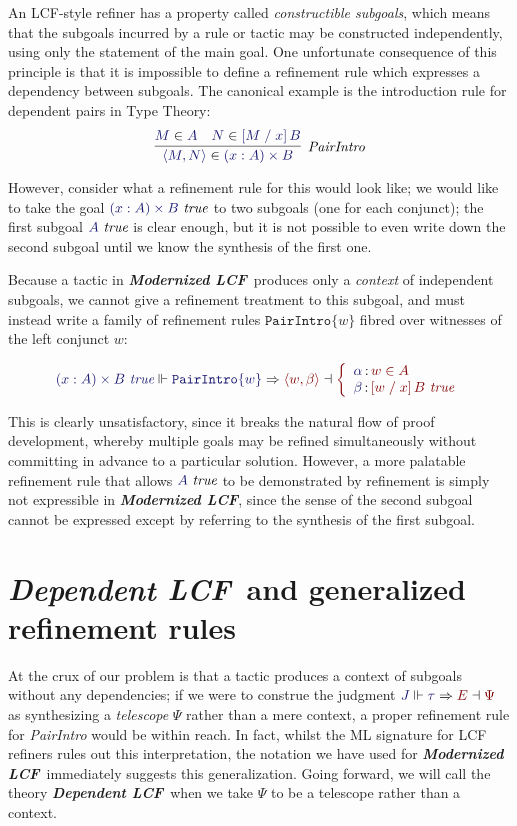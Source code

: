 \documentclass[11pt]{article}
\theoremstyle{definition}
\theoremstyle{remark}
\numberwithin{equation}{section}
\def\InputModeColorName{MidnightBlue}
\def\OutputModeColorName{Maroon}
\newcommand\InputMode[1]{{\color{\InputModeColorName}{#1}}}
\newcommand\OutputMode[1]{{\color{\OutputModeColorName}{#1}}}
\newcommand\JJ{J}
\newcommand\Tuple[1]{\left\langle#1\right\rangle}
\newcommand\OSG[2]{\InputMode{#1}\,{\color{Black}:}\,\OutputMode{#2}}
\newcommand\Refine[4]{\InputMode{#1}\Vdash\InputMode{#2}\Rightarrow\OutputMode{#4}\dashv\OutputMode{#3}}
\newcommand\Member[2]{\InputMode{#1}\in\InputMode{#2}}
\newcommand\MemberUnmoded[2]{#1\in #2}
\newcommand\IsTrue[1]{\InputMode{#1}\ \textit{true}}
\newcommand\IsTrueUnmoded[1]{#1\ \textit{true}}
\newcommand\DProdIntroRule[1]{\mathtt{PairIntro}\{#1\}}
\newcommand\TyDProd[3]{(#2:#1) \times #3}
\newcommand\Subst[3]{\left[#1\;/\;#2\right]#3}
\newcommand\ModLCF{\textbf{\emph{Modernized LCF}}}
\newcommand\DepLCF{\textbf{\emph{Dependent LCF}}}
\begin{document}
An LCF-style refiner has a property called \emph{constructible subgoals}, which
means that the subgoals incurred by a rule or tactic may be constructed
independently, using only the statement of the main goal. One unfortunate
consequence of this principle is that it is impossible to define a refinement
rule which expresses a dependency between subgoals. The canonical example is
the introduction rule for dependent pairs in Type Theory:
\[
  \infer[\textit{PairIntro}]{
    \Member{\Tuple{M,N}}{\TyDProd{A}{x}{B}}
  }{
    \Member{M}{A} &
    \Member{N}{\Subst{M}{x}{B}}
  }
\]

However, consider what a refinement rule for this would look like; we would
like to take the goal $\IsTrue{\TyDProd{A}{x}{B}}$ to two subgoals (one for
each conjunct); the first subgoal $\IsTrue{A}$ is clear enough, but it is not
possible to even write down the second subgoal until we know the synthesis of
the first one.

Because a tactic in \ModLCF\ produces only a \emph{context} of independent
subgoals, we cannot give a refinement treatment to this subgoal, and must
instead write a family of refinement rules $\DProdIntroRule{w}$ fibred over
witnesses of the left conjunct $w$:

\[
  \Refine{\IsTrueUnmoded{\TyDProd{A}{x}{B}}}{\DProdIntroRule{w}}{%
    \left\{\begin{array}{l}
      \OSG{\alpha}{\MemberUnmoded{w}{A}}\\
      \OSG{\beta}{\IsTrueUnmoded{\Subst{w}{x}{B}}}
    \end{array}\right.
  }{\Tuple{w,\beta}}
\]

This is clearly unsatisfactory, since it breaks the natural flow of proof
development, whereby multiple goals may be refined simultaneously without
committing in advance to a particular solution. However, a more palatable
refinement rule that allows $\IsTrue{A}$ to be demonstrated by refinement is
simply not expressible in \ModLCF, since the sense of the second subgoal cannot
be expressed except by referring to the synthesis of the first subgoal.

\section{\DepLCF\ and generalized refinement rules}

At the crux of our problem is that a tactic produces a context of subgoals
without any dependencies; if we were to construe the judgment
$\Refine{\JJ}{\tau}{\Psi}{E}$ as synthesizing a \emph{telescope} $\Psi$ rather
than a mere context, a proper refinement rule for \emph{PairIntro} would be
within reach. In fact, whilst the ML signature for LCF refiners rules out this
interpretation, the notation we have used for \ModLCF\ immediately suggests
this generalization. Going forward, we will call the theory \DepLCF\ when we
take $\Psi$ to be a telescope rather than a context.
\end{document}
